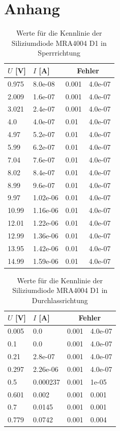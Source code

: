 \documentclass[a4paper,10pt]{article}
\numberwithin{equation}{section}
\begin{document}
\section{Anhang}
\begin{table}[h]
        \centering
\begin{tabular}{ llll }
        $U$ [V] & $I$ [A] & \multicolumn{2}{c}{Fehler}\\
	\hline
	 0.975  &  8.0e-08  &  0.001  &  4.0e-07 \\
	 2.009  &  1.6e-07  &  0.001  &  4.0e-07 \\
	 3.021  &  2.4e-07  &  0.001  &  4.0e-07 \\
	 4.0  &  4.0e-07  &  0.01  &  4.0e-07 \\
	 4.97  &  5.2e-07  &  0.01  &  4.0e-07 \\
	 5.99  &  6.2e-07  &  0.01  &  4.0e-07 \\
	 7.04  &  7.6e-07  &  0.01  &  4.0e-07 \\
	 8.02  &  8.4e-07  &  0.01  &  4.0e-07 \\
	 8.99  &  9.6e-07  &  0.01  &  4.0e-07 \\
	 9.97  &  1.02e-06  &  0.01  &  4.0e-07 \\
	 10.99  &  1.16e-06  &  0.01  &  4.0e-07 \\
	 12.01  &  1.22e-06  &  0.01  &  4.0e-07 \\
	 12.99  &  1.36e-06  &  0.01  &  4.0e-07 \\
	 13.95  &  1.42e-06  &  0.01  &  4.0e-07 \\
	 14.99  &  1.59e-06  &  0.01  &  4.0e-07
\end{tabular}
        \caption{Werte für die Kennlinie der Siliziumdiode MRA4004 D1 in Sperrrichtung}
\end{table}
\begin{table}[h]
        \centering
\begin{tabular}{ llll }
        $U$ [V] & $I$ [A] & \multicolumn{2}{c}{Fehler}\\
	\hline
	 0.005  &  0.0  &  0.001  &  4.0e-07 \\
	 0.1  &  0.0  &  0.001  &  4.0e-07 \\
	 0.21  &  2.8e-07  &  0.001  &  4.0e-07 \\
	 0.297  &  2.26e-06  &  0.001  &  4.0e-07 \\
	 0.5  &  0.000237  &  0.001  &  1e-05 \\
	 0.601  &  0.002  &  0.001  &  0.001 \\
	 0.7  &  0.0145  &  0.001  &  0.001 \\
	 0.779  &  0.0742  &  0.001  &  0.004
\end{tabular}
        \caption{Werte für die Kennlinie der Siliziumdiode MRA4004 D1 in Durchlassrichtung}
\end{table}
\end{document}
